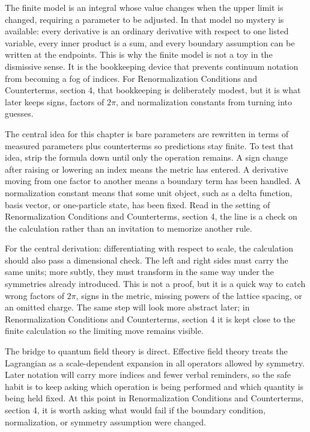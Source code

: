 The finite model is an integral whose value changes when the upper limit is changed, requiring a parameter to be adjusted.  In that model no mystery is available: every derivative is an ordinary derivative with respect to one listed variable, every inner product is a sum, and every boundary assumption can be written at the endpoints.  This is why the finite model is not a toy in the dismissive sense.  It is the bookkeeping device that prevents continuum notation from becoming a fog of indices.  For Renormalization Conditions and Counterterms, section 4, that bookkeeping is deliberately modest, but it is what later keeps signs, factors of \(2\pi\), and normalization constants from turning into guesses.

The central idea for this chapter is bare parameters are rewritten in terms of measured parameters plus counterterms so predictions stay finite.  To test that idea, strip the formula down until only the operation remains.  A sign change after raising or lowering an index means the metric has entered.  A derivative moving from one factor to another means a boundary term has been handled.  A normalization constant means that some unit object, such as a delta function, basis vector, or one-particle state, has been fixed.  Read in the setting of Renormalization Conditions and Counterterms, section 4, the line is a check on the calculation rather than an invitation to memorize another rule.

For the central derivation: differentiating with respect to scale, the calculation should also pass a dimensional check.  The left and right sides must carry the same units; more subtly, they must transform in the same way under the symmetries already introduced.  This is not a proof, but it is a quick way to catch wrong factors of \(2\pi\), signs in the metric, missing powers of the lattice spacing, or an omitted charge.  The same step will look more abstract later; in Renormalization Conditions and Counterterms, section 4 it is kept close to the finite calculation so the limiting move remains visible.

The bridge to quantum field theory is direct.  Effective field theory treats the Lagrangian as a scale-dependent expansion in all operators allowed by symmetry.  Later notation will carry more indices and fewer verbal reminders, so the safe habit is to keep asking which operation is being performed and which quantity is being held fixed.  At this point in Renormalization Conditions and Counterterms, section 4, it is worth asking what would fail if the boundary condition, normalization, or symmetry assumption were changed.

